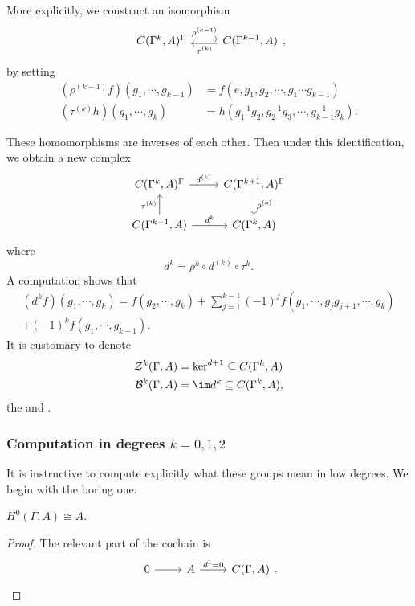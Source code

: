 \documentclass[a4paper]{article}
\begin{document}
More explicitly, we construct an isomorphism
\[
  \begin{tikzcd}
    C(\Gamma^k, A)^\Gamma \ar[r, yshift=2, "\rho^{(k - 1)}"] & C(\Gamma^{k - 1}, A)\ar[l, yshift=-2, "\tau^{(k)}"]
  \end{tikzcd},
\]
by setting
\begin{align*}
  (\rho^{(k - 1)} f)(g_1, \cdots, g_{k - 1}) &= f(e, g_1, g_2, \cdots, g_1 \cdots g_{k - 1})\\
  (\tau^{(k)} h)(g_1, \cdots, g_k) &= h (g_1^{-1} g_2, g_2^{-1} g_3, \cdots, g_{k - 1}^{-1} g_k).
\end{align*}

These homomorphisms are inverses of each other. Then under this identification, we obtain a new complex
\[
  \begin{tikzcd}
    C(\Gamma^k, A)^\Gamma \ar[r, "d^{(k)}"] & C(\Gamma^{k + 1}, A)^\Gamma \ar[d,"\rho^{(k)}"] \\
    C(\Gamma^{k - 1}, A) \ar[u, "\tau^{(k)}"] \ar[r, "d^{k}"] & C(\Gamma^k, A)
  \end{tikzcd}
\]
where
\[
  d^k = \rho^k \circ d^{(k)} \circ \tau^k.
\]
A computation shows that
\begin{align*}
  (d^k f) (g_1, \cdots, g_k) = f(g_2, \cdots, g_k) + \sum_{j = 1}^{k - 1} (-1)^j f(g_1, \cdots, g_j g_{j + 1}, \cdots, g_k) \\
  + (-1)^k f(g_1, \cdots, g_{k - 1}).
\end{align*}
It is customary to denote
\begin{align*}
  \mathcal{Z}^k(\Gamma, A) &= \ker^{d + 1} \subseteq C(\Gamma^k, A)\\
  \mathcal{B}^k (\Gamma, A) &= \im d^k \subseteq C(\Gamma^k, A),
\end{align*}
the  and .

\subsubsection*{Computation in degrees $k = 0, 1, 2$}
It is instructive to compute explicitly what these groups mean in low degrees. We begin with the boring one:
\begin{prop}
  $H^0(\Gamma, A) \cong A$.
\end{prop}

\begin{proof}
  The relevant part of the cochain is
  \[
    \begin{tikzcd}
      0 \ar[r] & A \ar[r, "d^1 = 0"] & C(\Gamma, A)
    \end{tikzcd}.
  \]
\end{proof}
\end{document}
